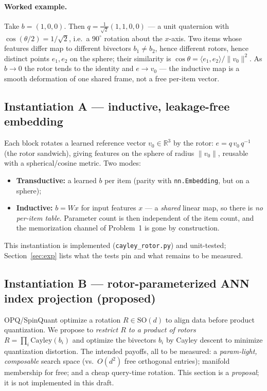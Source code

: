 \documentclass[11pt]{article}
\begin{document}
\paragraph{Worked example.} Take $b=(1,0,0)$. Then
$q=\tfrac{1}{\sqrt2}(1,1,0,0)$ --- a unit quaternion with $\cos(\theta/2)=1/\sqrt2$,
i.e.\ a $90^\circ$ rotation about the $x$-axis. Two items whose features differ
map to different bivectors $b_1\ne b_2$, hence different rotors, hence distinct
points $e_1,e_2$ on the sphere; their similarity is
$\cos\theta=\langle e_1,e_2\rangle/\lVert v_0\rVert^2$. As $b\to 0$ the rotor
tends to the identity and $e\to v_0$ --- the inductive map is a smooth deformation
of one shared frame, not a free per-item vector.

\subsection{Instantiation A --- inductive, leakage-free embedding}
\label{sec:method-emb}
Each block rotates a learned reference vector $v_0\in\mathbb{R}^3$ by the rotor:
$e = q\,v_0\,q^{-1}$ (the rotor sandwich), giving features on the sphere of radius
$\lVert v_0\rVert$, reusable with a spherical/cosine metric. Two modes:
\begin{itemize}[nosep]
  \item \textbf{Transductive:} a learned $b$ per item (parity with
        \texttt{nn.Embedding}, but on a sphere);
  \item \textbf{Inductive:} $b = W x$ for input features $x$ --- a \emph{shared}
        linear map, so there is \emph{no per-item table}. Parameter count is then
        independent of the item count, and the memorization channel of
        Problem~1 is gone by construction.
\end{itemize}
This instantiation is implemented (\texttt{cayley\_rotor.py}) and unit-tested;
Section~\ref{sec:exp} lists what the tests pin and what remains to be measured.

\subsection{Instantiation B --- rotor-parameterized ANN index projection (proposed)}
\label{sec:method-ann}
OPQ/SpinQuant optimize a rotation $R\in\mathrm{SO}(d)$ to align data before product
quantization. We propose to \emph{restrict $R$ to a product of rotors}
$R=\prod_i \mathrm{Cayley}(b_i)$ and optimize the bivectors $b_i$ by Cayley descent
to minimize quantization distortion. The intended payoffs, all to be measured: a
\emph{param-light, composable} search space (vs.\ $O(d^2)$ free orthogonal
entries); manifold membership for free; and a cheap query-time rotation. This
section is a \emph{proposal}; it is not implemented in this draft.
\end{document}
